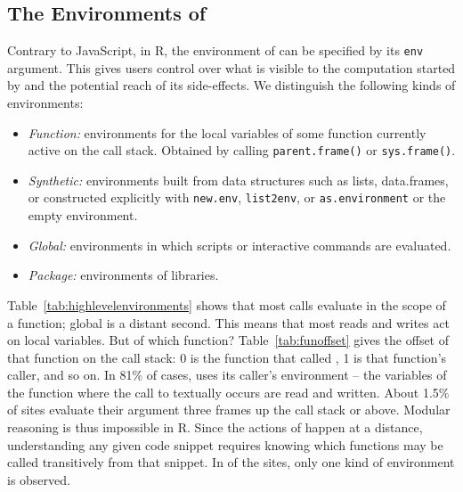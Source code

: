 \documentclass[acmsmall, screen]{acmart}
\renewcommand{\k}[1]{\lstinline |#1|\xspace}
\begin{document}
\subsection{The Environments of \Eval}\label{sec:env}

Contrary to JavaScript, in R, the environment of \eval can be specified by its
\k{env} argument. This gives users control over what is visible to the
computation started by \eval and the potential reach of its side-effects. We
distinguish the following kinds of environments:

\enlargethispage{2mm}
\begin{itemize}[---]
\item \emph{Function:} environments for the local variables of some function
  currently active on the call stack. Obtained by calling \k{parent.frame()} or
  \k{sys.frame()}.
\item \emph{Synthetic:} environments built from data structures such as lists,
  data.frames, or constructed explicitly with \k{new.env}, \k{list2env}, or
  \k{as.environment} or the empty environment.
\item \emph{Global:} environments in which scripts or interactive commands are
  evaluated.
\item \emph{Package:} environments of libraries.
\end{itemize}


Table~\ref{tab:highlevelenvironments} shows that most calls evaluate in the
scope of a function; global is a distant second. This means that most reads and
writes act on local variables. But of which function? Table~\ref{tab:funoffset}
gives the offset of that function on the call stack: 0 is the function that called
\eval, 1 is that function's caller, and so on. In 81\% of cases, \eval uses
its caller's environment -- the variables of the function where the call to \eval
textually occurs are read and written. About 1.5\% of sites evaluate their
argument three frames up the call stack or above. Modular reasoning is thus
impossible in R. Since the actions of \eval happen at a distance, understanding
any given code snippet requires knowing which functions may be called
transitively from that snippet. In \packageNbOneCategoryEnvirSitePercent of
the sites, only one kind of environment is observed.
\end{document}

